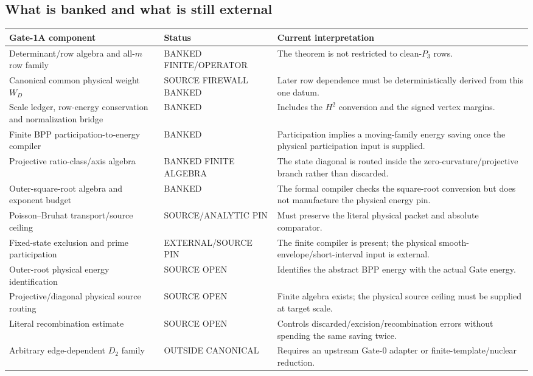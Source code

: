 \documentclass[11pt]{article}
\theoremstyle{definition}
\newcommand{\1}{\mathbf 1}
\newcommand{\status}[1]{\textsf{#1}}
\begin{document}
\subsection{What is banked and what is still external}

\begin{center}
\scriptsize
\renewcommand{\arraystretch}{1.15}
\begin{tabularx}{\textwidth}{>{\raggedright\arraybackslash}p{}
>{\raggedright\arraybackslash}p{}X}
\toprule
Gate-1A component & Status & Current interpretation\\
\midrule
Determinant/row algebra and all-$m$ row family & \status{BANKED FINITE/OPERATOR} &
The theorem is not restricted to clean-$P_3$ rows.\\
Canonical common physical weight $W_D$ & \status{SOURCE FIREWALL BANKED} &
Later row dependence must be deterministically derived from this one datum.\\
Scale ledger, row-energy conservation and normalization bridge & \status{BANKED} &
Includes the $H^2$ conversion and the signed vertex margins.\\
Finite BPP participation-to-energy compiler & \status{BANKED} &
Participation implies a moving-family energy saving once the physical participation input is supplied.\\
Projective ratio-class/axis algebra & \status{BANKED FINITE ALGEBRA} &
The state diagonal is routed inside the zero-curvature/projective branch rather than discarded.\\
Outer-square-root algebra and exponent budget & \status{BANKED} &
The formal compiler checks the square-root conversion but does not manufacture the physical energy pin.\\
Poisson--Bruhat transport/source ceiling & \status{SOURCE/ANALYTIC PIN} &
Must preserve the literal physical packet and absolute comparator.\\
Fixed-state exclusion and prime participation & \status{EXTERNAL/SOURCE PIN} &
The finite compiler is present; the physical smooth-envelope/short-interval input is external.\\
Outer-root physical energy identification & \status{SOURCE OPEN} &
Identifies the abstract BPP energy with the actual Gate energy.\\
Projective/diagonal physical source routing & \status{SOURCE OPEN} &
Finite algebra exists; the physical source ceiling must be supplied at target scale.\\
Literal recombination estimate & \status{SOURCE OPEN} &
Controls discarded/excision/recombination errors without spending the same saving twice.\\
Arbitrary edge-dependent $D_2$ family & \status{OUTSIDE CANONICAL} &
Requires an upstream Gate-0 adapter or finite-template/nuclear reduction.\\
\bottomrule
\end{tabularx}
\end{center}
\end{document}
